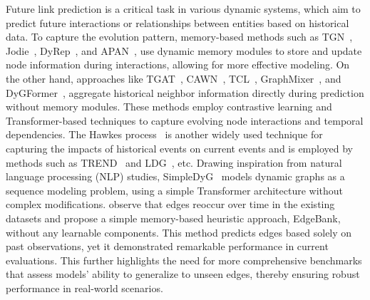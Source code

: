 Future link prediction is a critical task in various dynamic systems, which aim to predict future interactions or relationships between entities based on historical data. 
To capture the evolution pattern, memory-based methods such as TGN~\citep{TGN}, Jodie~\citep{Jodie}, DyRep~\citep{DyRep}, and APAN~\citep{APAN}, use dynamic memory modules to store and update node information during interactions, allowing for more effective modeling. 
On the other hand, approaches like TGAT~\citep{TGAT}, CAWN~\citep{CAWN}, TCL~\citep{TCL}, GraphMixer~\citep{GraphMixer}, and DyGFormer~\citep{DyGFormer}, aggregate historical neighbor information directly during prediction without memory modules. These methods employ contrastive learning and Transformer-based techniques to capture evolving node interactions and temporal dependencies. The Hawkes process~\citep{Hawkes1,Hawkes2} is another widely used technique for capturing the impacts of historical events on current events and is employed by methods such as TREND~\citep{TREND} and LDG~\citep{LDG}, etc.
Drawing inspiration from natural language processing (NLP) studies, SimpleDyG~\citep{simpledyg} models dynamic graphs as a sequence modeling problem, using a simple Transformer architecture without complex modifications.
\citet{edgebank} observe that edges reoccur over time in the existing datasets and propose a simple memory-based heuristic approach, EdgeBank, without any learnable components. 
This method predicts edges based solely on past observations, yet it demonstrated remarkable performance in current evaluations. 
This further highlights the need for more comprehensive benchmarks that assess models' ability to generalize to unseen edges, thereby ensuring robust performance in real-world scenarios.